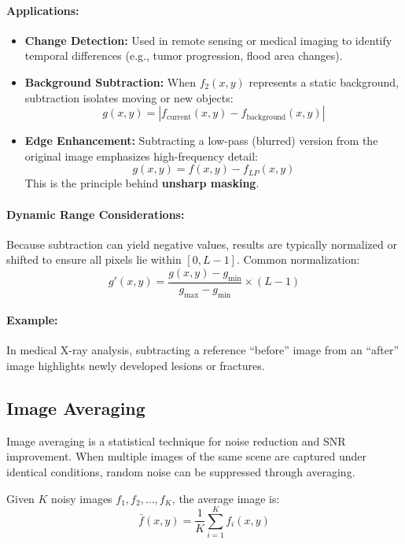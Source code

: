 \documentclass[12pt,a4paper]{AnantDocumentation}
\begin{document}
\paragraph{Applications:}
\begin{itemize}
\item \textbf{Change Detection:}  
Used in remote sensing or medical imaging to identify temporal differences (e.g., tumor progression, flood area changes).
\item \textbf{Background Subtraction:}  
When $f_2(x, y)$ represents a static background, subtraction isolates moving or new objects:
\[
g(x, y) = | f_{\text{current}}(x, y) - f_{\text{background}}(x, y) |
\]
\item \textbf{Edge Enhancement:}  
Subtracting a low-pass (blurred) version from the original image emphasizes high-frequency detail:
\[
g(x, y) = f(x, y) - f_{LP}(x, y)
\]
This is the principle behind \textbf{unsharp masking}.
\end{itemize}

\paragraph{Dynamic Range Considerations:}  
Because subtraction can yield negative values, results are typically normalized or shifted to ensure all pixels lie within $[0, L-1]$.  
Common normalization:
\[
g'(x, y) = \frac{g(x, y) - g_{\min}}{g_{\max} - g_{\min}} \times (L - 1)
\]

\paragraph{Example:}  
In medical X-ray analysis, subtracting a reference “before” image from an “after” image highlights newly developed lesions or fractures.

\subsection{Image Averaging}

Image averaging is a statistical technique for noise reduction and SNR improvement.  
When multiple images of the same scene are captured under identical conditions, random noise can be suppressed through averaging.

Given $K$ noisy images $f_1, f_2, \dots, f_K$, the average image is:
\begin{equation}
\bar{f}(x, y) = \frac{1}{K} \sum_{i=1}^{K} f_i(x, y)
\end{equation}
\end{document}
